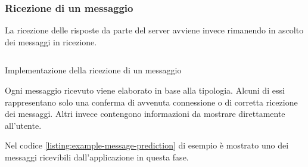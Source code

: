 \subsubsection{Ricezione di un messaggio}
La ricezione delle risposte da parte del server avviene invece rimanendo in ascolto 
dei messaggi in ricezione.
\begin{listing}[H] 
    \inputminted[frame=single,framesep=10pt]{java}{assets/snippets/app/connection/receive.java}
    \caption{Implementazione della ricezione di un messaggio}
\end{listing}
\vspace{5mm} %
\noindent Ogni messaggio ricevuto viene elaborato in base alla tipologia. Alcuni di essi rappresentano solo una conferma di avvenuta 
connessione o di corretta ricezione dei messaggi. Altri invece contengono informazioni da mostrare direttamente all'utente.

\vspace{5mm} %
Nel codice \ref{listing:example-message-prediction} di esempio è mostrato uno dei messaggi ricevibili dall'applicazione in questa fase.